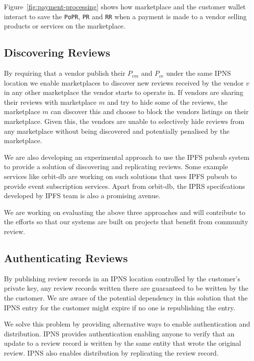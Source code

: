 \documentclass[a4paper]{article}
\begin{document}
Figure~\ref{fig:payment-processing} shows how marketplace and the
customer wallet interact to save the \texttt{PoPR}, \texttt{PR} and
\texttt{RR} when a payment is made to a vendor selling products or
services on the marketplace.

\subsection{Discovering Reviews}\label{discovering-reviews}

By requiring that a vendor publish their $P_{vm}$ and $P_{ve}$ under
the same IPNS location we enable marketplaces to discover new reviews
received by the vendor $v$ in any other marketplace the vendor starts
to operate in. If vendors are sharing their reviews with marketplace
$m$ and try to hide some of the reviews, the marketplace $m$ can
discover this and choose to block the vendors listings on their
marketplace. Given this, the vendors are unable to selectively hide
reviews from any marketplace without being discovered and potentially
penalised by the marketplace.

We are also developing an experimental approach to use the IPFS pubsub
system to provide a solution of discovering and replicating
reviews. Some example services like orbit-db\cite{orbitdb} are working
on such solutions that uses IPFS pubsub to provide event subscription
services. Apart from orbit-db, the IPRS\cite{iprs} specifcations
developed by IPFS team is also a promising avenue.

We are working on evaluating the above three approaches and will
contribute to the efforts so that our systems are built on projects
that benefit from community review.

\subsection{Authenticating Reviews}\label{sec:authenticating-reviews}

By publishing review records in an IPNS location controlled by the
customer's private key, any review records written there are
guaranteed to be written by the the customer. We are aware of the
potential dependency in this solution that the IPNS entry for the
customer might expire if no one is republishing the entry.

We solve this problem by providing alternative ways to enable
authentication and distribution. IPNS provides authentication enabling
anyone to verify that an update to a review record is written by the
same entity that wrote the original review. IPNS also enables
distribution by replicating the review record.
\end{document}
